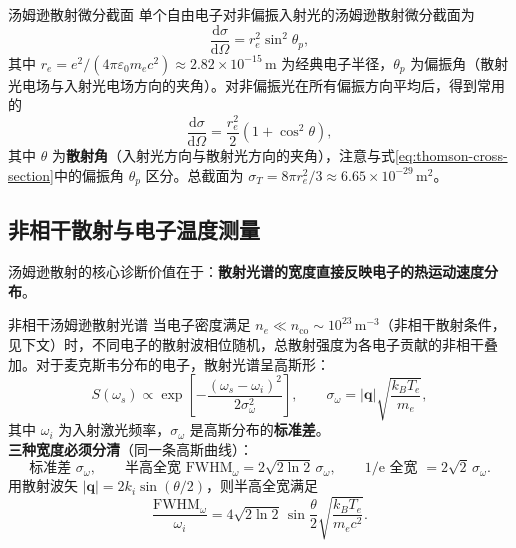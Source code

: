 \documentclass[12pt,a4paper,openany,oneside]{book}
\newcommand{\diff}{\mathrm{d}}
\newcommand{\ee}{\mathrm{e}}
\newcommand{\eps}{\varepsilon}
\newcommand{\vect}[1]{\bm{#1}}
\begin{document}
\begin{definition}{汤姆逊散射微分截面}{}{}
单个自由电子对非偏振入射光的汤姆逊散射微分截面为
\begin{equation}
\frac{\diff\sigma}{\diff\Omega} = r_e^2 \sin^2\theta_p,
\label{eq:thomson-cross-section}
\end{equation}
其中 $r_e = e^2/(4\pi\eps_0 m_e c^2) \approx 2.82\times 10^{-15}\,\mathrm{m}$ 为经典电子半径，$\theta_p$ 为偏振角（散射光电场与入射光电场方向的夹角）。对非偏振光在所有偏振方向平均后，得到常用的
\begin{equation}
\frac{\diff\sigma}{\diff\Omega} = \frac{r_e^2}{2}(1 + \cos^2\theta),
\label{eq:thomson-unpolarized}
\end{equation}
其中 $\theta$ 为\textbf{散射角}（入射光方向与散射光方向的夹角），注意与式\eqref{eq:thomson-cross-section}中的偏振角 $\theta_p$ 区分。总截面为 $\sigma_T = 8\pi r_e^2/3 \approx 6.65\times 10^{-29}\,\mathrm{m}^2$。
\end{definition}

\subsection{非相干散射与电子温度测量}

汤姆逊散射的核心诊断价值在于：\textbf{散射光谱的宽度直接反映电子的热运动速度分布}。

\begin{theorem}{非相干汤姆逊散射光谱}{}{}
当电子密度满足 $n_e \ll n_{\mathrm{co}} \sim 10^{23}\,\mathrm{m}^{-3}$（非相干散射条件，见下文）时，不同电子的散射波相位随机，总散射强度为各电子贡献的非相干叠加。对于麦克斯韦分布的电子，散射光谱呈高斯形：
\begin{equation}
S(\omega_s) \propto \exp\!\left[-\frac{(\omega_s - \omega_i)^2}{2\sigma_\omega^2}\right],
\qquad
\sigma_\omega = |\vect{q}|\sqrt{\frac{k_BT_e}{m_e}},
\label{eq:thomson-gaussian}
\end{equation}
其中 $\omega_i$ 为入射激光频率，$\sigma_\omega$ 是高斯分布的\textbf{标准差}。\\
\textbf{三种宽度必须分清}（同一条高斯曲线）：
\[
\text{标准差 } \sigma_\omega,\qquad
\text{半高全宽 } \mathrm{FWHM}_\omega = 2\sqrt{2\ln2}\,\sigma_\omega,\qquad
\text{$1/\ee$ 全宽 } = 2\sqrt2\,\sigma_\omega .
\]
用散射波矢 $|\vect{q}| = 2k_i\sin(\theta/2)$，则半高全宽满足
\begin{equation}
\frac{\mathrm{FWHM}_\omega}{\omega_i} = 4\sqrt{2\ln 2}\,\sin\frac{\theta}{2}
\sqrt{\frac{k_BT_e}{m_e c^2}}.
\label{eq:thomson-width}
\end{equation}
\end{theorem}
\end{document}
